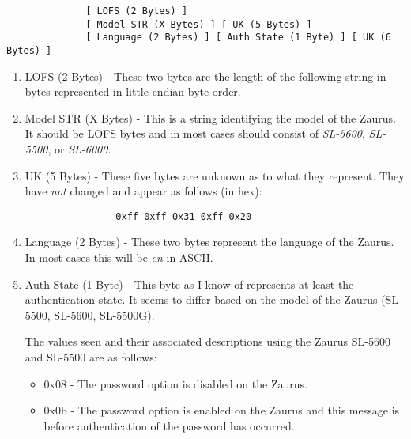             \begin{verbatim}
              [ LOFS (2 Bytes) ]
              [ Model STR (X Bytes) ] [ UK (5 Bytes) ]
              [ Language (2 Bytes) ] [ Auth State (1 Byte) ] [ UK (6 Bytes) ]
            \end{verbatim}

            \begin{enumerate}
              \item LOFS (2 Bytes) - These two bytes are the length of the
              following string in bytes represented in little endian byte
              order.

              \item Model STR (X Bytes) - This is a string identifying the
              model of the Zaurus. It should be LOFS bytes and in most cases
              should consist of \emph{SL-5600}, \emph{SL-5500}, or
              \emph{SL-6000}.

              \item UK (5 Bytes) - These five bytes are unknown as to what
              they represent. They have \emph{not} changed and appear as
              follows (in hex):

              \begin{verbatim}
                0xff 0xff 0x31 0xff 0x20
              \end{verbatim}

              \item Language (2 Bytes) - These two bytes represent the
              language of the Zaurus. In most cases this will be \emph{en} in
              ASCII.

              \item Auth State (1 Byte) - This byte as I know of represents
              at least the authentication state. It seems to differ based on
              the model of the Zaurus (SL-5500, SL-5600, SL-5500G). 

              The values seen and their associated descriptions using the
              Zaurus SL-5600 and SL-5500 are as follows:
              \begin{itemize}
                \item 0x08 - The password option is disabled on the Zaurus. 

                \item 0x0b - The password option is enabled on the Zaurus and
                this message is before authentication of the password has
                occurred.


\end{itemize}
\end{enumerate}
